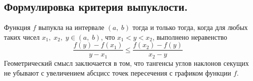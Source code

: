 \begin{definition}
    \subsection*{Формулировка критерия выпуклости.}
    \begin{note}[purple]
        Функция $f$ выпукла на интервале $(a, \; b)$ тогда и только тогда, когда для любых
        таких чисел $x_1, \; x_2, \; y \in (a, \; b)$, что $x_1 < y < x_2$, выполнено 
        неравенство 
        $$ 
        \frac{f(y) - f(x_1)}{y - x_1} \leq 
        \frac{f(x_2) - f(y)}{x_2 - y}
        $$
        Геометрический смысл заключается в том, что тангенсы углов наклонов секущих не убывают
        с увеличением абсцисс точек пересечения с графиком функции $f$. 
    \end{note}
\end{definition}